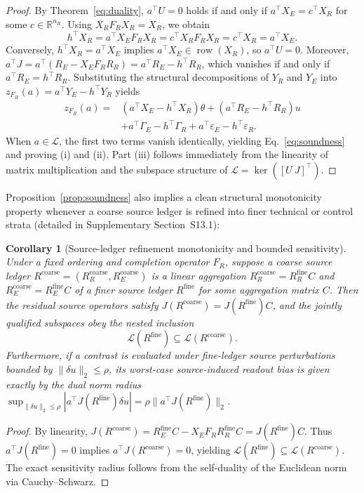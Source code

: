 \documentclass[preprint,12pt,number,sort&compress]{elsarticle}
\newtheorem{corollary}{Corollary}
\newcommand{\R}{\mathbb{R}}
\DeclareMathOperator{\row}{row}
\begin{document}
\begin{proof}
By Theorem~\ref{eq:duality}, $a^\top U = 0$ holds if and only if $a^\top X_E = c^\top X_R$ for some $c \in \R^{n_R}$. Using $X_R F_R X_R = X_R$, we obtain
\[
h^\top X_R = a^\top X_E F_R X_R = c^\top X_R F_R X_R = c^\top X_R = a^\top X_E.
\]
Conversely, $h^\top X_R = a^\top X_E$ implies $a^\top X_E \in \row(X_R)$, so $a^\top U = 0$. Moreover, $a^\top J = a^\top(R_E - X_E F_R R_R) = a^\top R_E - h^\top R_R$, which vanishes if and only if $a^\top R_E = h^\top R_R$. Substituting the structural decompositions of $Y_R$ and $Y_E$ into $z_{F_R}(a) = a^\top Y_E - h^\top Y_R$ yields
\[
\begin{aligned}
z_{F_R}(a) ={}& (a^\top X_E - h^\top X_R)\theta + (a^\top R_E - h^\top R_R)u\\
&+ a^\top \Gamma_E - h^\top \Gamma_R + a^\top \varepsilon_E - h^\top \varepsilon_R.
\end{aligned}
\]
When $a \in \mathcal{L}$, the first two terms vanish identically, yielding Eq.~\eqref{eq:soundness} and proving (i) and (ii). Part (iii) follows immediately from the linearity of matrix multiplication and the subspace structure of $\mathcal{L} = \ker([U\ J]^\top)$.
\end{proof}

Proposition~\ref{prop:soundness} also implies a clean structural monotonicity property whenever a coarse source ledger is refined into finer technical or control strata (detailed in Supplementary Section~S13.1):

\begin{corollary}[Source-ledger refinement monotonicity and bounded sensitivity]\label{cor:refinement}
Under a fixed ordering and completion operator $F_R$, suppose a coarse source ledger $R^{\mathrm{coarse}} = (R_R^{\mathrm{coarse}}, R_E^{\mathrm{coarse}})$ is a linear aggregation $R_R^{\mathrm{coarse}} = R_R^{\mathrm{fine}} C$ and $R_E^{\mathrm{coarse}} = R_E^{\mathrm{fine}} C$ of a finer source ledger $R^{\mathrm{fine}}$ for some aggregation matrix $C$. Then the residual source operators satisfy $J(R^{\mathrm{coarse}}) = J(R^{\mathrm{fine}})C$, and the jointly qualified subspaces obey the nested inclusion
\[
\mathcal{L}(R^{\mathrm{fine}}) \subseteq \mathcal{L}(R^{\mathrm{coarse}}).
\]
Furthermore, if a contrast is evaluated under fine-ledger source perturbations bounded by $\|\delta u\|_2 \le \rho$, its worst-case source-induced readout bias is given exactly by the dual norm radius $\sup_{\|\delta u\|_2 \le \rho} |a^\top J(R^{\mathrm{fine}}) \delta u| = \rho \|a^\top J(R^{\mathrm{fine}})\|_2$.
\end{corollary}
\begin{proof}
By linearity, $J(R^{\mathrm{coarse}}) = R_E^{\mathrm{fine}}C - X_E F_R R_R^{\mathrm{fine}}C = J(R^{\mathrm{fine}})C$. Thus $a^\top J(R^{\mathrm{fine}}) = 0$ implies $a^\top J(R^{\mathrm{coarse}}) = 0$, yielding $\mathcal{L}(R^{\mathrm{fine}}) \subseteq \mathcal{L}(R^{\mathrm{coarse}})$. The exact sensitivity radius follows from the self-duality of the Euclidean norm via Cauchy--Schwarz.
\end{proof}
\end{document}
